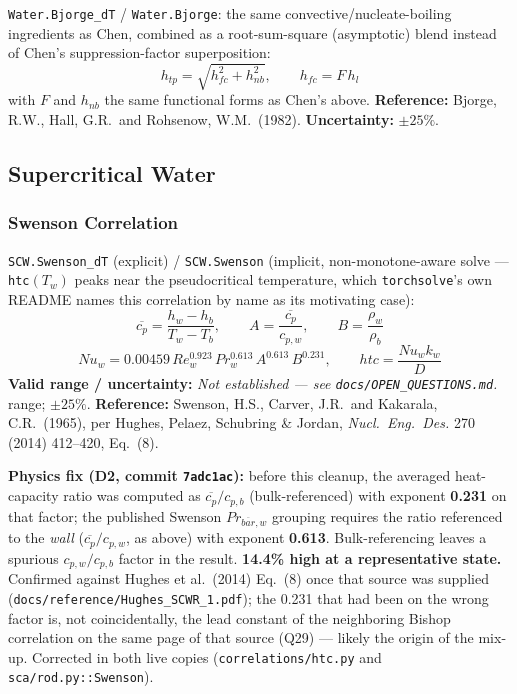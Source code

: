 \documentclass[11pt]{article}
\newcommand{\code}[1]{\texttt{#1}}
\newcommand{\notest}{\textit{Not established --- see \code{docs/OPEN\_QUESTIONS.md}.}}
\begin{document}
\code{Water.Bjorge\_dT} / \code{Water.Bjorge}: the same convective/nucleate-boiling
ingredients as Chen, combined as a root-sum-square (asymptotic) blend instead of Chen's
suppression-factor superposition:
\[
  h_{tp} = \sqrt{h_{fc}^2 + h_{nb}^2}, \qquad h_{fc} = F\,h_l
\]
with $F$ and $h_{nb}$ the same functional forms as Chen's above. \textbf{Reference:}
Bjorge, R.W., Hall, G.R.\ and Rohsenow, W.M.\ (1982). \textbf{Uncertainty:} $\pm25\%$.

\subsection{Supercritical Water}

\subsubsection{Swenson Correlation}

\code{SCW.Swenson\_dT} (explicit) / \code{SCW.Swenson} (implicit, non-monotone-aware
solve --- \code{htc}$(T_w)$ peaks near the pseudocritical temperature, which
\code{torchsolve}'s own README names this correlation by name as its motivating case):
\[
  \overline{c_p} = \frac{h_w-h_b}{T_w-T_b}, \qquad A = \frac{\overline{c_p}}{c_{p,w}},
  \qquad B = \frac{\rho_w}{\rho_b}
\]
\[
  Nu_w = 0.00459\,Re_w^{0.923}\,Pr_w^{0.613}\,A^{0.613}\,B^{0.231}, \qquad htc = \frac{Nu_w k_w}{D}
\]
\textbf{Valid range / uncertainty:} \notest{} range; $\pm25\%$. \textbf{Reference:}
Swenson, H.S., Carver, J.R.\ and Kakarala, C.R.\ (1965), per Hughes, Pelaez, Schubring
\& Jordan, \emph{Nucl.\ Eng.\ Des.} 270 (2014) 412--420, Eq.\ (8).

\textbf{Physics fix (D2, commit \code{7adc1ac}):} before this cleanup, the averaged
heat-capacity ratio was computed as $\overline{c_p}/c_{p,b}$ (bulk-referenced) with
exponent \textbf{0.231} on that factor; the published Swenson $Pr_{\overline{bar},w}$
grouping requires the ratio referenced to the \emph{wall} ($\overline{c_p}/c_{p,w}$,
as above) with exponent \textbf{0.613}. Bulk-referencing leaves a spurious
$c_{p,w}/c_{p,b}$ factor in the result. \textbf{14.4\% high at a representative state.}
Confirmed against Hughes et al.\ (2014) Eq.\ (8) once that source was supplied
(\code{docs/reference/Hughes\_SCWR\_1.pdf}); the 0.231 that had been on the wrong factor
is, not coincidentally, the lead constant of the neighboring Bishop correlation on the
same page of that source (Q29) --- likely the origin of the mix-up. Corrected in both
live copies (\code{correlations/htc.py} and \code{sca/rod.py::Swenson}).
\end{document}
